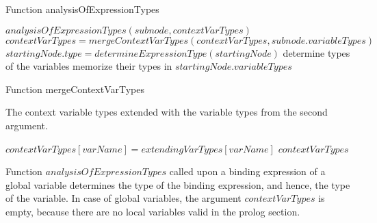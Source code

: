 \begin{algorithm}
\caption{Function analysisOfExpressionTypes}
\label{ALG_func_analysisOfExpressionTypes}
\begin{algorithmic}[1]

    \STATE $analysisOfExpressionTypes(subnode, contextVarTypes)$ 
        \STATE $contextVarTypes = mergeContextVarTypes(contextVarTypes, subnode.variableTypes)$
    \ENDIF
\ENDFOR
{}
    \STATE $startingNode.type = determineExpressionType(startingNode)$
\ENDIF
{}
    \STATE determine types of the variables
    \STATE memorize their types in $startingNode.variableTypes$
\ENDIF
\end{algorithmic}
\end{algorithm}



\begin{algorithm}
\caption{Function mergeContextVarTypes}
\label{ALG_function_mergeContextVarTypes}
\begin{algorithmic}[1]
\ENSURE The context variable types extended with the variable types from the second argument.

    \STATE $contextVarTypes[varName] = extendingVarTypes[varName]$
\ENDFOR
\RETURN $contextVarTypes$
\end{algorithmic}
\end{algorithm}

Function $analysisOfExpressionTypes$ called upon a binding expression of a global variable determines the type of the binding expression, and hence, the type of the variable. In case of global variables, the argument $contextVarTypes$ is empty, because there are no local variables valid in the prolog section.


